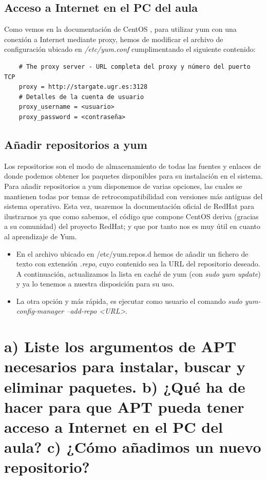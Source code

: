 	\subsection{Acceso a Internet en el PC del aula}
	Como vemos en la documentación de CentOS \cite{yum-proxy}, para utilizar yum con una conexión a Internet mediante proxy, hemos de modificar el archivo de configuración ubicado en \emph{/etc/yum.conf} cumplimentando el siguiente contenido: 
	\begin{verbatim}
	# The proxy server - URL completa del proxy y número del puerto TCP
	proxy = http://stargate.ugr.es:3128
	# Detalles de la cuenta de usuario
	proxy_username = <usuario>
	proxy_password = <contraseña>
	\end{verbatim}	
	
	\subsection{Añadir repositorios a yum}
	Los repositorios son el modo de almacenamiento de todas las fuentes y enlaces de donde podemos obtener los paquetes disponibles para su instalación en el sistema. Para añadir repositorios a yum disponemos de varias opciones, las cuales se mantienen todas por temas de retrocompatibilidad con versiones más antiguas del sistema operativo. Esta vez, usaremos la documentación oficial de RedHat para ilustrarnos \cite{yum-repo} ya que como sabemos, el código que compone CentOS deriva (gracias a su comunidad) del proyecto RedHat; y que por tanto nos es muy útil en cuanto al aprendizaje de Yum.
	\begin{itemize}
		\item En el archivo ubicado en /etc/yum.repos.d hemos de añadir un fichero de texto con extensión \emph{.repo}, cuyo contenido sea la URL del repositorio deseado. A continuación, actualizamos la lista en caché de yum (con \emph{sudo yum update}) y ya lo tenemos a nuestra disposición para su uso.
		\item La otra opción y más rápida, es ejecutar como usuario el comando \emph{sudo yum-config-manager --add-repo <URL>}.
	\end{itemize}


\section{a) Liste los argumentos de APT necesarios para instalar, buscar y eliminar
paquetes. b) ¿Qué ha de hacer para que APT pueda tener acceso a Internet en el PC
del aula? c) ¿Cómo añadimos un nuevo repositorio?}

